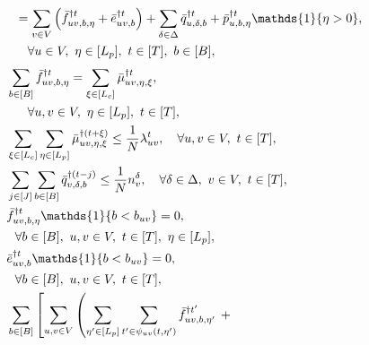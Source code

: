 {\begin{subequations}
\begin{align}
    &\quad= \sum_{\destination \in \Region} \left(\lpredtripfulfill{\origin \destination, \battery, \timetoarrival}{\time} + \lpredreroute{\origin \destination, \battery}{\time} \right) + \sum_{\type \in \Type} \lpredcharge{\origin, \type, \battery}{\time} + \lpredpass{\origin, \battery, \timetoarrival}{\time} \mathds{1}\{\timetoarrival > 0\},\nonumber\\ 
    &\qquad \forall \origin \in \Region, \   \timetoarrival \in [\Lp], \   \time \in [\Horizon], \  \battery \in [\range], \label{eq:fluid-ev-conservation}\\
    &\ \sum_{\battery \in [\range]}^{} \lpredtripfulfill{\origin \destination, \battery, \timetoarrival}{\time} = \sum_{\tripactivetime \in [\Lc]}^{} \lpredslack{\origin \destination, \timetoarrival, \tripactivetime}{\time}, \nonumber\\
    &\qquad \forall \origin, \destination \in \Region, \  \timetoarrival \in [\Lp], \  \time \in [\Horizon], \label{eq:fluid-passenger-flow-decomp}\\
    &\ \sum_{\tripactivetime \in [\Lc]}^{}\sum_{\timetoarrival \in [\Lp]}^{} \lpredslack{\origin \destination, \timetoarrival, \tripactivetime}{(\time + \tripactivetime)} \leq \frac{1}{\Size} \arrrate{\origin \destination}{\time}, \quad \forall \origin, \destination \in \Region, \ \time \in [\Horizon],\label{eq:fluid-passenger-flow-cap}\\
    &\ \sum_{j \in [\chargetime]} \sum_{\battery \in [\range]}^{} \lpredcharge{\region, \type, \battery}{(\time - j)} \leq \frac{1}{\Size} \n{\region}{\type}, \quad \forall \type \in \Type, \  \region \in \Region, \  \time \in [\Horizon], \label{eq:fluid-charging-cap}\\
    &\ \lpredtripfulfill{\origin \destination, \battery, \timetoarrival}{\time} \mathds{1}\{\battery < \batterycost{\origin \destination}\} = 0,\notag\\ 
    &\quad \forall \battery \in [\range], \  \origin, \destination \in \Region, \  \time \in [\Horizon], \  \timetoarrival \in [\Lp], \label{eq:fluid-passenger-flow-battery-sufficiency}\\
    &\ \lpredreroute{\origin \destination, \battery}{\time} \mathds{1}\{\battery < \batterycost{\origin \destination}\} = 0,\notag\\ 
    &\quad \forall \battery \in [\range], \  \origin, \destination \in \Region, \  \time \in [\Horizon], \label{eq:fluid-rerouting-flow-battery-sufficiency} \\
    &\ \sum_{\battery \in [\range]} \left[ \sum_{\origin, \destination \in \Region} \left(\sum_{\timetoarrival' \in [\Lp]}^{} \sum_{t' \in \psi_{\origin \destination}(t, \eta')}\lpredtripfulfill{\origin \destination, b, \eta'}{t'}  \right. \right. + \nonumber\\ 

\end{align}
\end{subequations}}
